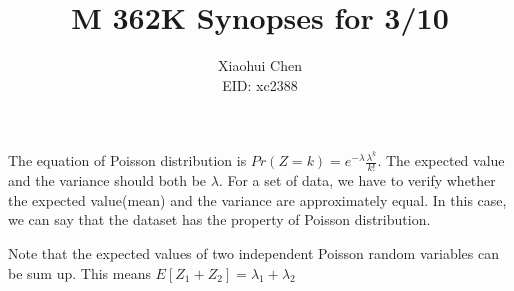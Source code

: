 \documentclass[12pt]{article}
\author{Xiaohui Chen \\EID: xc2388}
\title{M 362K Synopses for 3/10}
\begin{document}
\maketitle
\begin{spacing}{2.0}

The equation of Poisson distribution is $Pr(Z=k) = e^{-\lambda} \frac{\lambda^k}{k!}$. The expected value and the variance should both be $\lambda$. For a set of data, we have to verify whether the expected value(mean) and the variance are approximately equal. In this case, we can say that the dataset has the property of Poisson distribution.

Note that the expected values of two independent Poisson random variables can be sum up. This means $E[Z_1+Z_2]= \lambda_1 + \lambda_2$

\end{spacing}
\end{document}
